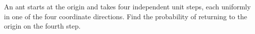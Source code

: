 An ant starts at the origin and takes four independent unit steps, each uniformly in one of the four coordinate directions. Find the probability of returning to the origin on the fourth step.
